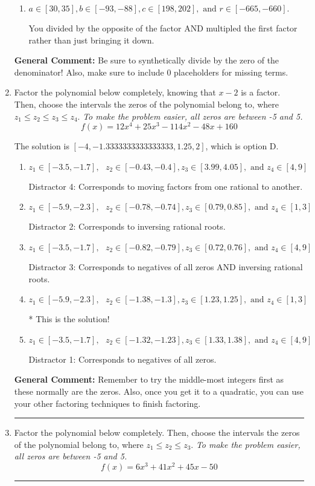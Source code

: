 \documentclass{extbook}[14pt]
\newcommand{\litem}[1]{\item #1

\rule{\textwidth}{0.4pt}}
\begin{document}
\begin{enumerate}
{\begin{enumerate}[label=\Alph*.]
* This is the solution!
\item \( a \in [30, 35], b \in [-93, -88], c \in [198, 202], \text{ and } r \in [-665, -660]. \)

 You divided by the opposite of the factor AND multipled the first factor rather than just bringing it down.
\end{enumerate}

\textbf{General Comment:} Be sure to synthetically divide by the zero of the denominator! Also, make sure to include 0 placeholders for missing terms.
}
\litem{
Factor the polynomial below completely, knowing that $x-2$ is a factor. Then, choose the intervals the zeros of the polynomial belong to, where $z_1 \leq z_2 \leq z_3 \leq z_4$. \textit{To make the problem easier, all zeros are between -5 and 5.}
\[ f(x) = 12x^{4} +25 x^{3} -114 x^{2} -48 x + 160 \]

The solution is \( [-4, -1.3333333333333333, 1.25, 2] \), which is option D.\begin{enumerate}[label=\Alph*.]
\item \( z_1 \in [-3.5, -1.7], \text{   }  z_2 \in [-0.43, -0.4], z_3 \in [3.99, 4.05], \text{   and   } z_4 \in [4, 9] \)

 Distractor 4: Corresponds to moving factors from one rational to another.
\item \( z_1 \in [-5.9, -2.3], \text{   }  z_2 \in [-0.78, -0.74], z_3 \in [0.79, 0.85], \text{   and   } z_4 \in [1, 3] \)

 Distractor 2: Corresponds to inversing rational roots.
\item \( z_1 \in [-3.5, -1.7], \text{   }  z_2 \in [-0.82, -0.79], z_3 \in [0.72, 0.76], \text{   and   } z_4 \in [4, 9] \)

 Distractor 3: Corresponds to negatives of all zeros AND inversing rational roots.
\item \( z_1 \in [-5.9, -2.3], \text{   }  z_2 \in [-1.38, -1.3], z_3 \in [1.23, 1.25], \text{   and   } z_4 \in [1, 3] \)

* This is the solution!
\item \( z_1 \in [-3.5, -1.7], \text{   }  z_2 \in [-1.32, -1.23], z_3 \in [1.33, 1.38], \text{   and   } z_4 \in [4, 9] \)

 Distractor 1: Corresponds to negatives of all zeros.
\end{enumerate}

\textbf{General Comment:} Remember to try the middle-most integers first as these normally are the zeros. Also, once you get it to a quadratic, you can use your other factoring techniques to finish factoring.
}
\litem{
Factor the polynomial below completely. Then, choose the intervals the zeros of the polynomial belong to, where $z_1 \leq z_2 \leq z_3$. \textit{To make the problem easier, all zeros are between -5 and 5.}
\[ f(x) = 6x^{3} +41 x^{2} +45 x -50 \]

}
\end{enumerate}
\end{document}
